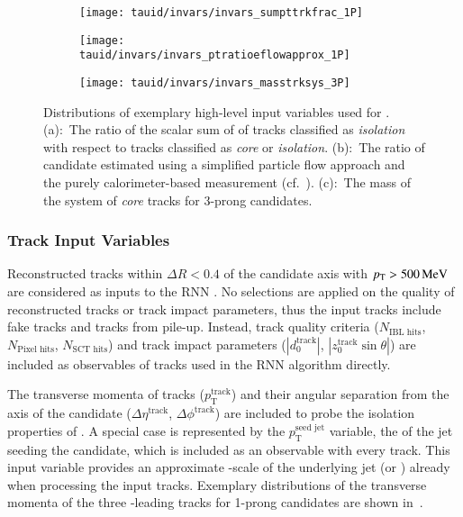 \begin{figure}[htbp]
  \centering

  \begin{subfigure}{0.33\textwidth}
    \texttt{[image: tauid/invars/invars\_sumpttrkfrac\_1P]}
    \subcaption{}
  \end{subfigure}\hfill%
  \begin{subfigure}{0.33\textwidth}
    \texttt{[image: tauid/invars/invars\_ptratioeflowapprox\_1P]}
    \subcaption{}
  \end{subfigure}\hfill%
  \begin{subfigure}{0.33\textwidth}
    \texttt{[image: tauid/invars/invars\_masstrksys\_3P]}
    \subcaption{}
  \end{subfigure}

  \caption{Distributions of exemplary high-level input variables used
    for \tauid. (a):~The ratio of the scalar sum of \pT of tracks
    classified as \emph{isolation} with respect to tracks classified
    as \emph{core} or \emph{isolation}. (b):~The ratio of \tauhadvis
    candidate \pT estimated using a simplified particle flow approach
    and the purely calorimeter-based measurement
    (cf.~). (c):~The mass of the
    system of \emph{core} tracks for 3-prong \tauhadvis candidates.}%
  \label{fig:tauid_high_level_vars}
\end{figure}


\subsubsection{Track Input Variables}

Reconstructed tracks within $\Delta R < 0.4$ of the \tauhadvis
candidate axis with $p_{\text{T}} > \SI{500}{\ensuremath{\text{MeV}}}$ are considered as inputs to
the RNN \tauid. No selections are applied on the quality of
reconstructed tracks or track impact parameters, thus the input tracks
include fake tracks and tracks from pile-up. Instead, track quality
criteria ($N_{\text{IBL hits}}$, $N_{\text{Pixel hits}}$,
$N_{\text{SCT hits}}$) and track impact parameters
($|d_0^{\text{track}}|$, $|z_0^{\text{track}} \sin\theta|$) are
included as observables of tracks used in the RNN \tauid algorithm
directly.

The transverse momenta of tracks ($p_{\text{T}}^{\text{track}}$) and
their angular separation from the axis of the \tauhadvis candidate
($\Delta \eta^{\text{track}}$, $\Delta \phi^{\text{track}}$) are
included to probe the isolation properties of \tauhadvis. A special
case is represented by the $p_{\text{T}}^{\text{seed jet}}$ variable,
the \pT of the jet seeding the \tauhadvis candidate, which is included
as an observable with every track. This input variable provides an
approximate \pT-scale of the underlying jet (or \tauhadvis) already
when processing the input tracks. Exemplary distributions of the
transverse momenta of the three \pT-leading tracks for 1-prong
\tauhadvis candidates are shown
in~.

